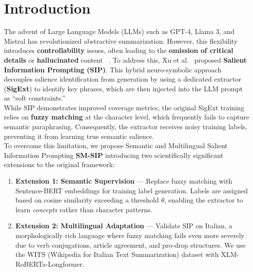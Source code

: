 \documentclass[conference]{IEEEtran}
\begin{document}
\section{Introduction}
The advent of Large Language Models (LLMs) such as GPT-4, Llama 3, and Mistral has revolutionized abstractive summarization. However, this flexibility introduces \textbf{controllability} issues, often leading to the \textbf{omission of critical details} or \textbf{hallucinated} content ~\cite{maynez2020faithfulness, cao2022hallucination}. To address this, Xu et al.~\cite{xu2024sip} proposed \textbf{Salient Information Prompting (SIP)}. This hybrid neuro-symbolic approach decouples salience identification from generation by using a dedicated extractor (\textbf{SigExt}) to identify key phrases, which are then injected into the LLM prompt as ``soft constraints.''\\
While SIP demonstrates improved coverage metrics, the original SigExt training relies on \textbf{fuzzy matching} at the character level, which frequently fails to capture semantic paraphrasing. Consequently, the extractor receives noisy training labels, preventing it from learning true semantic salience.\\
To overcome this limitation, we propose Semantic and Multilingual Salient Information Prompting \textbf{SM-SIP} introducing two scientifically significant extensions to the original framework:

\begin{enumerate}
    \item \textbf{Extension 1: Semantic Supervision} --- Replace fuzzy matching with Sentence-BERT embeddings for training label generation. Labels are assigned based on cosine similarity exceeding a threshold $\theta$, enabling the extractor to learn \textit{concepts} rather than character patterns.
    
    \item \textbf{Extension 2: Multilingual Adaptation} --- Validate SIP on Italian, a morphologically rich language where fuzzy matching fails even more severely due to verb conjugations, article agreement, and pro-drop structures. We use the WITS (Wikipedia for Italian Text Summarization) dataset with XLM-RoBERTa-Longformer.
\end{enumerate}

\end{document}
